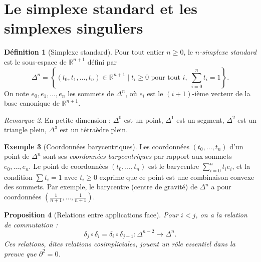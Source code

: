 \documentclass[12pt,a4paper,openany]{book}
\theoremstyle{definition}
\newtheorem{definition}{Définition}[chapter]
\newtheorem{exemple}[definition]{Exemple}
\theoremstyle{plain}
\newtheorem{proposition}[definition]{Proposition}
\theoremstyle{remark}
\newtheorem{remarque}[definition]{Remarque}
\newcommand{\R}{\mathbb{R}}
\newcommand{\set}[1]{\left\{#1\right\}}
\begin{document}
\section{Le simplexe standard et les simplexes singuliers}\label{sec:simplexe-standard}

\begin{definition}[Simplexe standard]\label{def:simplexe-standard}
Pour tout entier $n \geq 0$, le \emph{$n$-simplexe standard} est le sous-espace de $\R^{n+1}$
défini par
\[
  \Delta^n = \set{(t_0, t_1, \ldots, t_n) \in \R^{n+1} \;\Big|\; t_i \geq 0 \text{ pour tout } i, \;\sum_{i=0}^{n} t_i = 1}.
\]
On note $e_0, e_1, \ldots, e_n$ les sommets de $\Delta^n$, où $e_i$ est le $(i+1)$-ième vecteur de
la base canonique de $\R^{n+1}$.
\end{definition}

\begin{remarque}\label{rem:simplexes-bas}
En petite dimension : $\Delta^0$ est un point, $\Delta^1$ est un segment, $\Delta^2$ est un
triangle plein, $\Delta^3$ est un tétraèdre plein.
\end{remarque}

\begin{exemple}[Coordonnées barycentriques]\label{ex:coordonnees-barycentriques}
Les coordonnées $(t_0, \ldots, t_n)$ d'un point de $\Delta^n$ sont ses \emph{coordonnées
barycentriques} par rapport aux sommets $e_0, \ldots, e_n$. Le point de coordonnées
$(t_0, \ldots, t_n)$ est le barycentre $\sum_{i=0}^n t_i e_i$, et la condition $\sum t_i = 1$
avec $t_i \geq 0$ exprime que ce point est une combinaison convexe des sommets.
Par exemple, le barycentre (centre de gravité) de $\Delta^n$ a pour coordonnées
$(\frac{1}{n+1}, \ldots, \frac{1}{n+1})$.
\end{exemple}

\begin{proposition}[Relations entre applications face]\label{prop:relations-face}
Pour $i < j$, on a la relation de commutation :
\[
  \delta_j \circ \delta_i = \delta_i \circ \delta_{j-1} \colon \Delta^{n-2} \longrightarrow \Delta^n.
\]
Ces relations, dites \emph{relations cosimpliciales}, jouent un
rôle essentiel dans la preuve que $\partial^2 = 0$.
\end{proposition}
\end{document}
